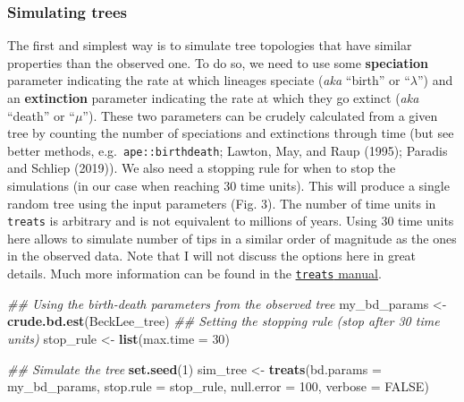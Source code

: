 \documentclass[
]{article}
\newenvironment{Shaded}{\begin{snugshade}}{\end{snugshade}}
\newcommand{\CommentTok}[1]{\textcolor[rgb]{0.56,0.35,0.01}{\textit{#1}}}
\newcommand{\DataTypeTok}[1]{\textcolor[rgb]{0.13,0.29,0.53}{#1}}
\newcommand{\DecValTok}[1]{\textcolor[rgb]{0.00,0.00,0.81}{#1}}
\newcommand{\KeywordTok}[1]{\textcolor[rgb]{0.13,0.29,0.53}{\textbf{#1}}}
\newcommand{\NormalTok}[1]{#1}
\newcommand{\OtherTok}[1]{\textcolor[rgb]{0.56,0.35,0.01}{#1}}
\newcommand{\StringTok}[1]{\textcolor[rgb]{0.31,0.60,0.02}{#1}}
\begin{document}
\hypertarget{simulating-trees}{%
\subsubsection{Simulating trees}\label{simulating-trees}}

The first and simplest way is to simulate tree topologies that have
similar properties than the observed one. To do so, we need to use some
\textbf{speciation} parameter indicating the rate at which lineages
speciate (\emph{aka} ``birth'' or ``\(\lambda\)'') and an
\textbf{extinction} parameter indicating the rate at which they go
extinct (\emph{aka} ``death'' or ``\(\mu\)''). These two parameters can
be crudely calculated from a given tree by counting the number of
speciations and extinctions through time (but see better methods,
e.g.~\texttt{ape::birthdeath}; Lawton, May, and Raup (1995); Paradis and
Schliep (2019)). We also need a stopping rule for when to stop the
simulations (in our case when reaching 30 time units). This will produce
a single random tree using the input parameters (Fig. 3). The number of
time units in \texttt{treats} is arbitrary and is not equivalent to
millions of years. Using 30 time units here allows to simulate number of
tips in a similar order of magnitude as the ones in the observed data.
Note that I will not discuss the options here in great details. Much
more information can be found in the
\href{http://tguillerme.github.io/treats.html}{\texttt{treats} manual}.

\begin{Shaded}
\begin{Highlighting}[]
\CommentTok{\#\# Using the birth{-}death parameters from the observed tree}
\NormalTok{my\_bd\_params \textless{}{-}}\StringTok{ }\KeywordTok{crude.bd.est}\NormalTok{(BeckLee\_tree)}
\CommentTok{\#\# Setting the stopping rule (stop after 30 time units)}
\NormalTok{stop\_rule \textless{}{-}}\StringTok{ }\KeywordTok{list}\NormalTok{(}\DataTypeTok{max.time =} \DecValTok{30}\NormalTok{)}

\CommentTok{\#\# Simulate the tree}
\KeywordTok{set.seed}\NormalTok{(}\DecValTok{1}\NormalTok{)}
\NormalTok{sim\_tree \textless{}{-}}\StringTok{ }\KeywordTok{treats}\NormalTok{(}\DataTypeTok{bd.params  =}\NormalTok{ my\_bd\_params,}
                   \DataTypeTok{stop.rule  =}\NormalTok{ stop\_rule,}
                   \DataTypeTok{null.error =} \DecValTok{100}\NormalTok{,}
                   \DataTypeTok{verbose    =} \OtherTok{FALSE}\NormalTok{)}
\end{Highlighting}
\end{Shaded}
\end{document}
